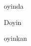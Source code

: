 \documentclass{article}
\begin{document}
	\begin{enumerate(}
		\item oyinda
		\item Doyin
		\item oyinkan
	\end{enumerate(}
\end{document}

